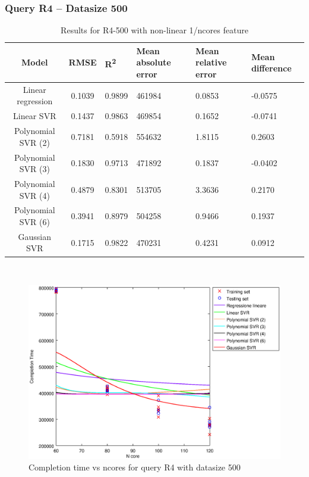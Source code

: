\documentclass[a4paper,11pt]{article}
\begin{document}
\newpage
\subsubsection{Query R4 -- Datasize 500}
\begin{table}[H]
	\centering
	\begin{adjustbox}{center}
		\begin{tabular}{c | c M{1.2cm} M{2.5cm} M{2.5cm} M{1.8cm}}
			Model & RMSE & R\textsuperscript{2} & Mean absolute error & Mean relative error & Mean difference \tabularnewline
			\hline
			Linear regression & 0.1039 & 0.9899 & 461984 & 0.0853 & -0.0575 \\
			Linear SVR & 0.1437 & 0.9863 & 469854 & 0.1652 & -0.0741 \\
			Polynomial SVR (2) & 0.7181 & 0.5918 & 554632 & 1.8115 & 0.2603 \\
			Polynomial SVR (3) & 0.1830 & 0.9713 & 471892 & 0.1837 & -0.0402 \\
			Polynomial SVR (4) & 0.4879 & 0.8301 & 513705 & 3.3636 & 0.2170 \\
			Polynomial SVR (6) & 0.3941 & 0.8979 & 504258 & 0.9466 & 0.1937 \\
			Gaussian SVR & 0.1715 & 0.9822 & 470231 & 0.4231 & 0.0912 \\
		\end{tabular}
	\end{adjustbox}
	\\
	\caption{Results for R4-500 with non-linear 1/ncores feature}
	\label{table_R4_prediction_all}
\end{table}

\begin {figure}[hbtp]
\centering
\includegraphics[width=\textwidth]{output/R4_500_1_OVER_NCORES/plot_R4_500.eps}
\caption {Completion time vs ncores for query R4 with datasize 500}
\end {figure}
\end{document}
